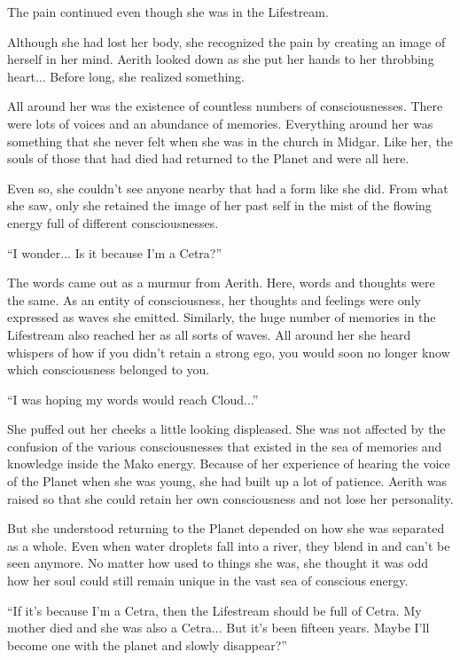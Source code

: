 \documentclass[oneside]{book}
\begin{document}
The pain continued even though she was in the Lifestream.

Although she had lost her body, she recognized the pain by creating an image of herself in her mind. Aerith looked down as she put her hands to her throbbing heart... Before long, she realized something.

All around her was the existence of countless numbers of consciousnesses. There were lots of voices and an abundance of memories. Everything around her was something that she never felt when she was in the church in Midgar. Like her, the souls of those that had died had returned to the Planet and were all here.

Even so, she couldn't see anyone nearby that had a form like she did. From what she saw, only she retained the image of her past self in the mist of the flowing energy full of different consciousnesses.

“I wonder... Is it because I'm a Cetra?”

The words came out as a murmur from Aerith. Here, words and thoughts were the same. As an entity of consciousness, her thoughts and feelings were only expressed as waves she emitted. Similarly, the huge number of memories in the Lifestream also reached her as all sorts of waves. All around her she heard whispers of how if you didn't retain a strong ego, you would soon no longer know which consciousness belonged to you.

“I was hoping my words would reach Cloud...”

She puffed out her cheeks a little looking displeased. She was not affected by the confusion of the various consciousnesses that existed in the sea of memories and knowledge inside the Mako energy. Because of her experience of hearing the voice of the Planet when she was young, she had built up a lot of patience. Aerith was raised so that she could retain her own consciousness and not lose her personality.

But she understood returning to the Planet depended on how she was separated as a whole. Even when water droplets fall into a river, they blend in and can't be seen anymore. No matter how used to things she was, she thought it was odd how her soul could still remain unique in the vast sea of conscious energy.

“If it's because I'm a Cetra, then the Lifestream should be full of Cetra. My mother died and she was also a Cetra... But it's been fifteen years. Maybe I'll become one with the planet and slowly disappear?”
\end{document}
